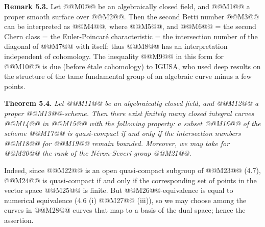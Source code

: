 \textbf{Remark 5.3.} Let @@M0@@ be an algebraically closed field, and @@M1@@ a proper smooth surface over @@M2@@. Then the second Betti number @@M3@@ can be interpreted as @@M4@@, where @@M5@@, and @@M6@@ = the second Chern class = the Euler-Poincar\'e characteristic = the intersection number of the diagonal of @@M7@@ with itself; thus @@M8@@ has an interpretation independent of cohomology. The inequality @@M9@@ in this form for @@M10@@ is due (before \'etale cohomology) to IGUSA, who used deep results on the structure of the tame fundamental group of an algebraic curve minus a few points.

\textbf{Theorem 5.4.} \emph{Let @@M11@@ be an algebraically closed field, and @@M12@@ a proper @@M13@@-scheme. Then there exist finitely many closed integral curves @@M14@@ in @@M15@@ with the following property: a subset @@M16@@ of the scheme @@M17@@ is quasi-compact if and only if the intersection numbers @@M18@@ for @@M19@@ remain bounded. Moreover, we may take for @@M20@@ the rank of the N\'eron-Severi group @@M21@@.}

Indeed, since @@M22@@ is an open quasi-compact subgroup of @@M23@@ (4.7), @@M24@@ is quasi-compact if and only if the corresponding set of points in the vector space @@M25@@ is finite. But @@M26@@-equivalence is equal to numerical equivalence (4.6 (i) @@M27@@ (iii)), so we may choose among the curves in @@M28@@ curves that map to a basis of the dual space; hence the assertion.

